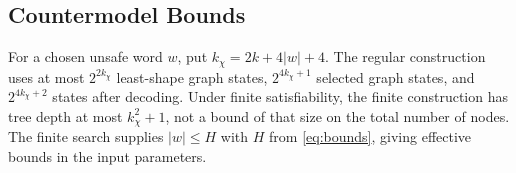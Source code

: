\subsection{Countermodel Bounds}\label{sec:countermodel-bounds}
For a chosen unsafe word $w$, put $k_\chi=2k+4|w|+4$. The regular
construction uses at most $2^{2k_\chi}$ least-shape graph states,
$2^{4k_\chi+1}$ selected graph states, and $2^{4k_\chi+2}$ states after
decoding. Under finite satisfiability, the finite construction has tree
depth at most $k_\chi^2+1$, not a bound of that size on the total number
of nodes. The finite search supplies $|w|\le H$ with $H$ from
\eqref{eq:bounds}, giving effective bounds in the input parameters.
